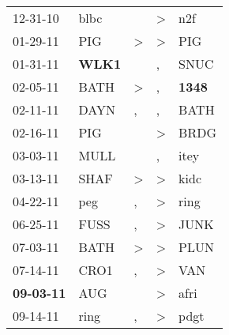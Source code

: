 \begin{supertabular}{p{0.07\textwidth}p{0.06\textwidth}p{0.02\textwidth}p{0.02\textwidth}p{0.06\textwidth}}
          12-31-10\textsuperscript{} &           blbc\textsuperscript{} &                  &  \textgreater &            n2f\textsuperscript{} \\
          01-29-11\textsuperscript{} &            PIG\textsuperscript{} &     \textgreater &  \textgreater &            PIG\textsuperscript{} \\
          01-31-11\textsuperscript{} &  \textbf{WLK1\textsuperscript{}} &                  &             , &           SNUC\textsuperscript{} \\
          02-05-11\textsuperscript{} &           BATH\textsuperscript{} &     \textgreater &             , &  \textbf{1348\textsuperscript{}} \\
          02-11-11\textsuperscript{} &           DAYN\textsuperscript{} &                , &             , &           BATH\textsuperscript{} \\
          02-16-11\textsuperscript{} &            PIG\textsuperscript{} &                  &  \textgreater &           BRDG\textsuperscript{} \\
          03-03-11\textsuperscript{} &           MULL\textsuperscript{} &                  &             , &           itey\textsuperscript{} \\
          03-13-11\textsuperscript{} &           SHAF\textsuperscript{} &     \textgreater &  \textgreater &           kidc\textsuperscript{} \\
          04-22-11\textsuperscript{} &            peg\textsuperscript{} &                , &  \textgreater &           ring\textsuperscript{} \\
          06-25-11\textsuperscript{} &           FUSS\textsuperscript{} &                , &  \textgreater &           JUNK\textsuperscript{} \\
          07-03-11\textsuperscript{} &           BATH\textsuperscript{} &     \textgreater &  \textgreater &           PLUN\textsuperscript{} \\
          07-14-11\textsuperscript{} &           CRO1\textsuperscript{} &                , &  \textgreater &            VAN\textsuperscript{} \\
 \textbf{09-03-11\textsuperscript{}} &            AUG\textsuperscript{} &                  &  \textgreater &           afri\textsuperscript{} \\
          09-14-11\textsuperscript{} &           ring\textsuperscript{} &                , &  \textgreater &           pdgt\textsuperscript{} \\

\end{supertabular}
